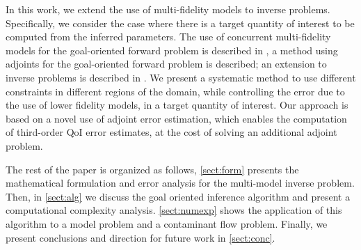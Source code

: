 
In this work, we extend the use of multi-fidelity models to inverse problems. Specifically, we consider the case where there is a target quantity of interest to be computed from the inferred parameters. The use of concurrent multi-fidelity models for the goal-oriented forward problem is described in \cite{OdenPrudetal06}, a method using adjoints for the goal-oriented forward problem is described; an extension to inverse problems is described in \cite{OdenPrudetal10}. We present a systematic method to use different constraints in different regions of the domain, while controlling the error due to the use of lower fidelity models, in a target quantity of interest. Our approach is based on a novel use of adjoint error estimation, which enables the computation of third-order QoI error estimates, at the cost of solving an additional adjoint problem.

The rest of the paper is organized as follows, \cref{sect:form} presents the mathematical formulation and error analysis for the multi-model inverse problem. Then, in \cref{sect:alg} we discuss the goal oriented inference algorithm and present a computational complexity analysis. \cref{sect:numexp} shows the application of this algorithm to a model problem and a contaminant flow problem. Finally, we present conclusions and direction for future work in \cref{sect:conc}.

